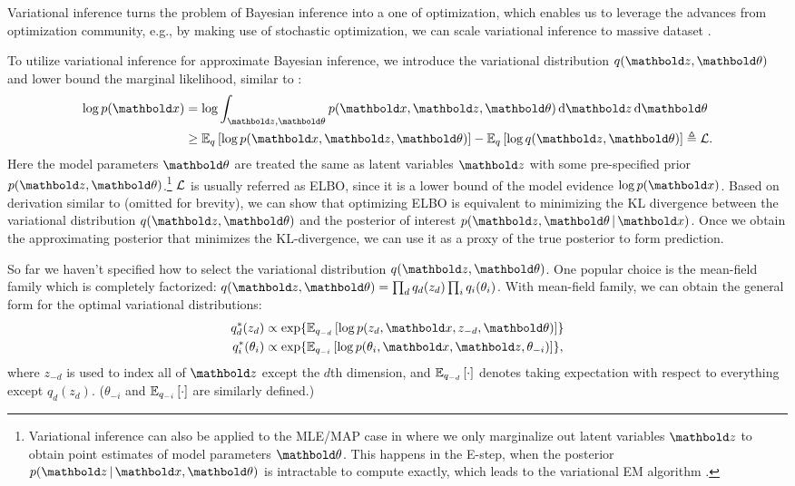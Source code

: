 Variational inference turns the problem of Bayesian inference into a one of  optimization, which enables us to leverage the advances from optimization community, e.g., by making use of stochastic optimization, we can scale variational inference to massive dataset \citep{hoffman2013stochastic}.

To utilize variational inference for approximate Bayesian inference, we introduce the variational distribution $q(\mbz, \mb\theta)$ and lower bound the marginal likelihood, similar to :
\begin{equation}
\begin{split}
\log p(\mbx) &= \log\int_{\mbz, \mb\theta} p(\mbx, \mbz, \mb\theta) \dif{\mbz} \dif\mb\theta \\
&\geq \EE{q}{\log p(\mbx, \mbz, \mb\theta)} - \EE{q}{\log q(\mbz, \mb\theta)}\triangleq \cL.
\end{split}
\label{chpt:background:eq:vi}
\end{equation}
Here the model parameters $\mb\theta$ are treated the same as latent variables $\mbz$ with some pre-specified prior $p(\mbz, \mb\theta)$.\footnote{Variational inference can also be applied to the MLE/MAP case in  where we only marginalize out latent variables $\mbz$ to obtain point estimates of model parameters $\mb\theta$. This happens in the E-step, when the posterior $p(\mbz \g \mbx, \mb\theta)$ is intractable to compute exactly, which leads to the variational \gls{EM} algorithm \citep{beal2003variational}.} $\mathcal{L}$ is usually referred as \gls{ELBO}, since it is a lower bound of the model evidence $\log p(\mbx)$. Based on derivation similar to  (omitted for brevity), we can show that optimizing \gls{ELBO} is equivalent to minimizing the \gls{KL} divergence between the variational distribution $q(\mbz, \mb\theta)$ and the posterior of interest $p(\mbz, \mb\theta \g \mbx)$. Once we obtain the approximating posterior that minimizes the \gls{KL}-divergence, we can use it as a proxy of the true posterior to form prediction. 

So far we haven't specified how to select the variational distribution $q(\mbz, \mb\theta)$. One popular choice is the mean-field family which is completely factorized: $q(\mbz, \mb\theta) = \prod_{d} q_d(z_{d}) \prod_i q_i(\theta_i)$. With mean-field family, we can obtain the general form for the optimal variational distributions:
\begin{equation}
\begin{split}
q^*_d(z_d) &\propto \exp\{\EE{q_{-d}}{\log p(z_d, \mbx, z_{-d}, \mb\theta)}\}
\\
q^*_i(\theta_i) &\propto \exp\{\EE{q_{-i}}{\log p(\theta_i, \mbx, \mbz, \theta_{-i})}\},
\end{split}
\label{chpt:background:eq:opt_q}
\end{equation}
where $z_{-d}$ is used to index all of $\mbz$ except the $d$th dimension, and $\mathbb{E}_{q_{-d}}\left[\cdot\right]$ denotes taking expectation with respect to everything except $q_d(z_d)$. ($\theta_{-i}$ and $\mathbb{E}_{q_{-i}}\left[\cdot\right]$ are similarly defined.)

